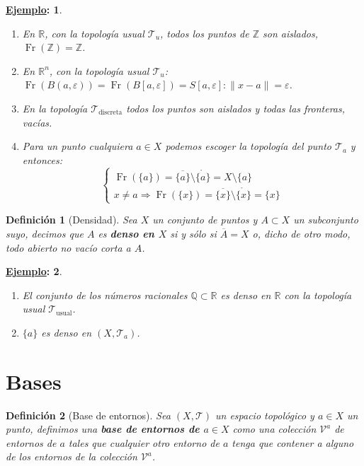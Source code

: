 \documentclass[10pt,a4paper,openright]{book}
\theoremstyle{break}
\newtheorem*{defi}{Definición}
\newtheorem*{ej}{\underline{Ejemplo}:}
\DeclareMathOperator{\fr}{Fr}
\begin{document}
\begin{ej}
\begin{enumerate}
    \item En $\mathbb{R}$, con la topología usual $\mathcal{T}_u$, todos los puntos de $\mathbb{Z}$ son aislados, $\fr\left( \mathbb{Z} \right) = \mathbb{Z}$.
    \item En $\mathbb{R}^n$, con la topología usual $\mathcal{T}_u$: $\fr\left( B\left( a, \varepsilon \right) \right) = \fr\left( B\left[ a, \varepsilon \right] \right) = S\left[ a, \varepsilon \right] : \lVert x - a \rVert = \varepsilon$.
    \item En la topología $\mathcal{T}_{\text{discreta}}$ todos los puntos son aislados y todas las fronteras, vacías.
    \item Para un punto cualquiera $a \in X$ podemos escoger la topología del punto $\mathcal{T}_a$ y entonces:
$$
\begin{cases}
	\fr\left( \{a\} \right) = \overline{\{a\}} \setminus \mathring{\{a\}} = X \setminus \{a\} \\
    x \neq a \Rightarrow \fr\left( \{x\} \right) = \overline{\{x\}} \setminus \mathring{\{x\}} = \{x\} 
\end{cases} 
$$
\end{enumerate}
\end{ej}

\begin{defi}[Densidad]
Sea $X$ un conjunto de puntos y $A \subset X$ un subconjunto suyo, decimos que $A$ es \textbf{denso en $X$} si y sólo si $\overline{A} = X$ o, dicho de otro modo, todo abierto no vacío corta a $A$.
\end{defi}

\begin{ej}
\begin{enumerate}
    \item El conjunto de los números racionales $\mathbb{Q} \subset \mathbb{R}$ es denso en $\mathbb{R}$ con la topología usual $\mathcal{T}_{\text{usual}}$.
    \item $\{a\}$ es denso en $\left( X, \mathcal{T}_a \right)$.
\end{enumerate}
\end{ej}

\section{Bases}%
\label{sec:bases}
\begin{defi}[Base de entornos]
Sea $(X, \mathcal{T})$ un espacio topológico y $a\in X$ un punto, definimos una \textbf{base de entornos de $a \in X$} como una colección $\mathcal{V}^a$ de entornos de $a$ tales que cualquier otro entorno de $a$ tenga que contener a alguno de los entornos de la colección $\mathcal{V}^a$.
\end{defi}
\end{document}
